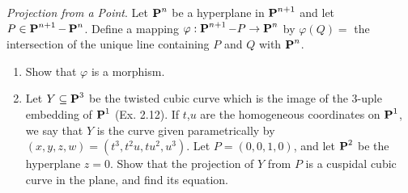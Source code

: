 \documentclass[10pt]{amsart}
\begin{document}
\begin{exercise}[3.14]
    \emph{Projection from a Point}. Let $\operatorname{\mathbf{P}}^n$ be a hyperplane in $\operatorname{\mathbf{P}}^{n+1}$ and let $P \in \operatorname{\mathbf{P}}^{n+1} - \operatorname{\mathbf{P}}^n$. 
    Define a mapping $\varphi : \operatorname{\mathbf{P}}^{n+ 1} - P \to \operatorname{\mathbf{P}}^n$ by $\varphi(Q) = $ the intersection of the unique line containing $P$ and $Q$ 
    with $\operatorname{\mathbf{P}}^n$.
    \begin{enumerate}[itemsep=1pt]
        \item Show that $\varphi$ is a morphism.
        \item Let $Y \subseteq \operatorname{\mathbf{P}}^3$ be the twisted cubic curve which is the image of the 
        3-uple embedding of $\operatorname{\mathbf{P}}^1$ (Ex. 2.12). If $t$,$u$ are the homogeneous coordinates on $\operatorname{\mathbf{P}}^1$, 
        we say that $Y$ is the curve given parametrically by $(x,y,z,w) = (t^3,t^2u,tu^2,u^3)$. 
        Let $P = (0,0,1,0)$, and let $\operatorname{\mathbf{P}}^2$ be the hyperplane $z = 0$. Show that the projection of 
        $Y$ from $P$ is a cuspidal cubic curve in the plane, and find its equation.
    \end{enumerate}
\end{exercise}
\end{document}
